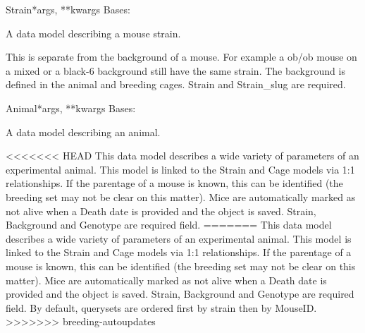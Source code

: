 \documentclass[letterpaper,10pt,english]{sphinxmanual}
\begin{document}
\hypertarget{animal.models.Strain}{}\begin{classdesc}{Strain}{*args, **kwargs}
Bases: 

A data model describing a mouse strain.

This is separate from the background of a mouse.  For example a ob/ob mouse on a mixed or a black-6 background still have the same strain.  The background is defined in the animal and breeding cages.  Strain and Strain\_slug are required.
\end{classdesc}

\hypertarget{animal.models.Animal}{}\begin{classdesc}{Animal}{*args, **kwargs}
Bases: 

A data model describing an animal.

<<<<<<< HEAD
This data model describes a wide variety of parameters of an experimental animal.  This model is linked to the Strain and Cage models via 1:1 relationships.  If the parentage of a mouse is known, this can be identified (the breeding set may not be clear on this matter). Mice are automatically marked as not alive when a Death date is provided and the object is saved.  Strain, Background and Genotype are required field.
=======
This data model describes a wide variety of parameters of an experimental animal.  This model is linked to the Strain and Cage models via 1:1 relationships.  If the parentage of a mouse is known, this can be identified (the breeding set may not be clear on this matter). Mice are automatically marked as not alive when a Death date is provided and the object is saved.  Strain, Background and Genotype are required field.  By default, querysets are ordered first by strain then by MouseID.
>>>>>>> breeding-autoupdates
\end{classdesc}
\end{document}
